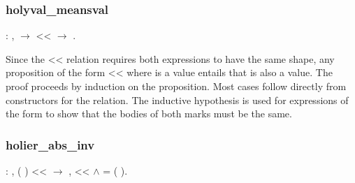 \documentclass[12pt]{report}
\begin{document}
\begin{prooftree}
\end{prooftree}

\begin{prooftree}
\end{prooftree}


\subsubsection{holyval\_meansval}

\begin{coqdoccode}
\coqdocemptyline
\coqdocindent{1.00em}
  : \coqdockw{\ensuremath{\forall}}  ,\coqdoceol
\coqdocindent{2.00em}
  \ensuremath{\rightarrow}\coqdoceol
\coqdocindent{2.00em}
 <<  \ensuremath{\rightarrow}\coqdoceol
\coqdocindent{2.00em}
 .\coqdoceol
\coqdocemptyline
\end{coqdoccode}

Since the << relation requires both expressions to have the same
shape, any proposition of the form  << 
where  is a value entails that  is also
a value. The proof proceeds by induction on the 
proposition.  Most cases follow directly from constructors for the
 relation. The inductive hypothesis is used for
expressions of the form  
 to show that the bodies of both marks must be the
same. 

\subsubsection{holier\_abs\_inv}

\begin{coqdoccode}
\coqdocemptyline
\coqdocindent{1.00em}
  : \coqdockw{\ensuremath{\forall}}    ,\coqdoceol
\coqdocindent{2.00em}
(   ) <<  \ensuremath{\rightarrow}\coqdoceol
\coqdocindent{2.00em}
\coqdoctac{\ensuremath{\exists}} ,  <<  \ensuremath{\land}  = (   ).\coqdoceol
\coqdocemptyline
\end{coqdoccode}
\end{document}
